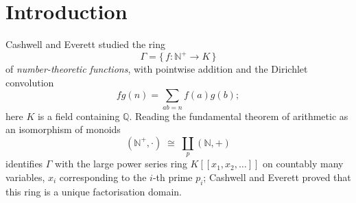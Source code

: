 \documentclass[a4paper,11pt,oneside,reqno]{amsart}
\theoremstyle{definition}
\theoremstyle{remark}
\theoremstyle{plain}
\newcommand{\NN}{\mathbb{N}}
\newcommand{\QQ}{\mathbb{Q}}
\newcommand{\Gam}{\Gamma}
\newcommand{\seqnum}[1]{\href{https://oeis.org/#1}{\underline{#1}}}
\begin{document}
\begin{abstract}
  Let \(K\) be a field containing \(\QQ\), let \(\Gam\) be the ring of all
  functions \(\NN^+\to K\) under Dirichlet convolution, and let \(\Gam_n\) be
  its truncation to functions supported on \([1,n]\). In \cite{Snellman2000} it was shown that \(\Gam_n\) is a
  polynomial ring modulo a monomial ideal \(I_n\) which is stable after
  reversing the order of the variables, and the Poincaré--Betti series of
  \(\Gam_n\) was computed in terms of the numbers \(C_{n,v}\) of minimal
  generators of \(I_n\) of least support \(v\).

  We prove that \(C_{n,v} = \Phi(n,p_v)\), Legendre's sifting function: the
  number of integers in \([1,n]\) free of prime factors \(\le p_v\). This
  identifies an invariant of a minimal free resolution with a classical object
  of sieve theory, and it refines to the grading by total degree, with the
  number of prime factors carried in a variable. As consequences we obtain: a proof of Conjecture 4.6 of
  \cite{Snellman2000}, which was left open there; the asymptotics
  \(C_n \sim \pi(n)^2/2\) of the total number of minimal generators, showing that
  the lower bound \(C_n \ge \binom{\pi(n)+1}{2}\) of \cite{Snellman2000} is
  asymptotically sharp, together with the exact order
  \(C_n-\binom{\pi(n)+1}{2} \sim \tfrac{16}{3}n^{3/2}/\log^{3}n\) of the error;
  and the identification of \(C_n\) with the OEIS sequence \seqnum{A182843}. We also record errata for \cite{Snellman2000}: one
  stated result is false, one worked example is miscomputed, and two proofs are
  incomplete. Corrected statements
  and complete proofs are given.
\end{abstract}

\section{Introduction}

Cashwell and Everett \cite{CashwellEverett} studied the ring
\begin{equation}
  \Gam = \{\,f \colon \NN^+\to K\,\}
\end{equation}
of \emph{number-theoretic functions}, with pointwise addition and the Dirichlet
convolution
\begin{equation}
  fg(n) = \sum_{ab = n}f(a)g(b);
\end{equation}
here \(K\) is a field containing \(\QQ\). Reading the fundamental theorem of
arithmetic as an isomorphism of monoids
\begin{equation}\label{eq:monoid}
  (\NN^+,\cdot)\;\cong \;\coprod_{p}(\NN,+)
\end{equation}
identifies \(\Gam\) with the large power series ring \(K[[x_1,x_2,\dots]]\) on
countably many variables, \(x_i\) corresponding to the \(i\)-th prime \(p_i\);
Cashwell and Everett proved that this ring is a unique factorisation domain.
\end{document}
